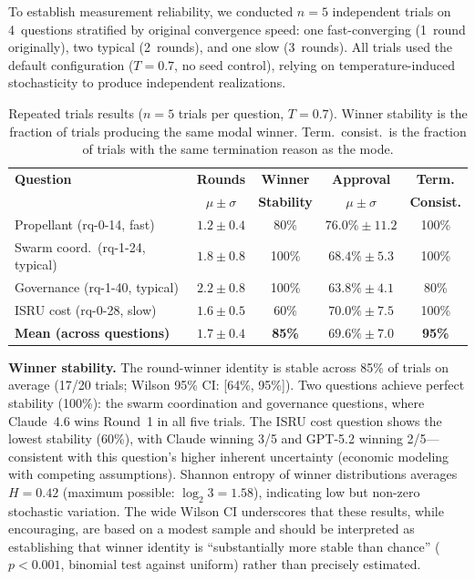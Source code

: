 \documentclass[11pt,a4paper]{article}
\begin{document}
To establish measurement reliability, we conducted $n = 5$ independent trials on 4~questions stratified by original convergence speed: one fast-converging (1~round originally), two typical (2~rounds), and one slow (3~rounds). All trials used the default configuration ($T = 0.7$, no seed control), relying on temperature-induced stochasticity to produce independent realizations.

\begin{table}[ht]
\centering
\caption{Repeated trials results ($n = 5$ trials per question, $T = 0.7$). Winner stability is the fraction of trials producing the same modal winner. Term.\ consist.\ is the fraction of trials with the same termination reason as the mode.}
\label{tab:repeated_trials}
\begin{tabular}{@{}lcccc@{}}
\toprule
\textbf{Question} & \textbf{Rounds} & \textbf{Winner} & \textbf{Approval} & \textbf{Term.} \\
 & $\mu \pm \sigma$ & \textbf{Stability} & $\mu \pm \sigma$ & \textbf{Consist.} \\
\midrule
Propellant (rq-0-14, fast) & $1.2 \pm 0.4$ & 80\% & $76.0\% \pm 11.2$ & 100\% \\
Swarm coord.\ (rq-1-24, typical) & $1.8 \pm 0.8$ & 100\% & $68.4\% \pm 5.3$ & 100\% \\
Governance (rq-1-40, typical) & $2.2 \pm 0.8$ & 100\% & $63.8\% \pm 4.1$ & 80\% \\
ISRU cost (rq-0-28, slow) & $1.6 \pm 0.5$ & 60\% & $70.0\% \pm 7.5$ & 100\% \\
\midrule
\textbf{Mean (across questions)} & $1.7 \pm 0.4$ & \textbf{85\%} & $69.6\% \pm 7.0$ & \textbf{95\%} \\
\bottomrule
\end{tabular}
\end{table}

\textbf{Winner stability.} The round-winner identity is stable across 85\% of trials on average (17/20 trials; Wilson 95\% CI: [64\%, 95\%]). Two questions achieve perfect stability (100\%): the swarm coordination and governance questions, where Claude~4.6 wins Round~1 in all five trials. The ISRU cost question shows the lowest stability (60\%), with Claude winning 3/5 and GPT-5.2 winning 2/5---consistent with this question's higher inherent uncertainty (economic modeling with competing assumptions). Shannon entropy of winner distributions averages $H = 0.42$ (maximum possible: $\log_2 3 = 1.58$), indicating low but non-zero stochastic variation. The wide Wilson CI underscores that these results, while encouraging, are based on a modest sample and should be interpreted as establishing that winner identity is ``substantially more stable than chance'' ($p < 0.001$, binomial test against uniform) rather than precisely estimated.
\end{document}
